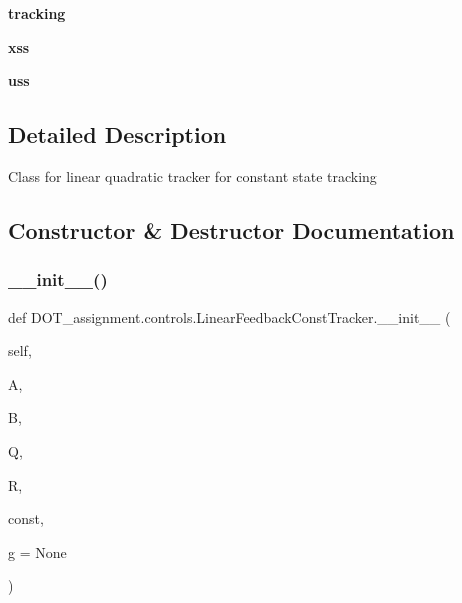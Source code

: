 \begin{DoxyCompactItemize}
{\bfseries tracking}
\item 
\mbox{\label{class_d_o_t__assignment_1_1controls_1_1_linear_feedback_const_tracker_ad8b1fe4cdba0cbaa2b9a0e2f9b909912}} 
{\bfseries xss}
\item 
\mbox{\label{class_d_o_t__assignment_1_1controls_1_1_linear_feedback_const_tracker_a99284b17b98cde148849456310574857}} 
{\bfseries uss}
\end{DoxyCompactItemize}


\subsection{Detailed Description}
\begin{DoxyVerb}Class for linear quadratic tracker for constant state tracking
\end{DoxyVerb}
 

\subsection{Constructor \& Destructor Documentation}
\mbox{\label{class_d_o_t__assignment_1_1controls_1_1_linear_feedback_const_tracker_a5673a5219e7675de2bf80ea945aa33f1}} 
\subsubsection{\texorpdfstring{\_\_init\_\_()}{\_\_init\_\_()}}
{\footnotesize\ttfamily def D\+O\+T\+\_\+assignment.\+controls.\+Linear\+Feedback\+Const\+Tracker.\+\_\+\+\_\+init\+\_\+\+\_\+ (\begin{DoxyParamCaption}\item[{}]{self,  }\item[{}]{A,  }\item[{}]{B,  }\item[{}]{Q,  }\item[{}]{R,  }\item[{}]{const,  }\item[{}]{g = {\ttfamily None} }\end{DoxyParamCaption})}

